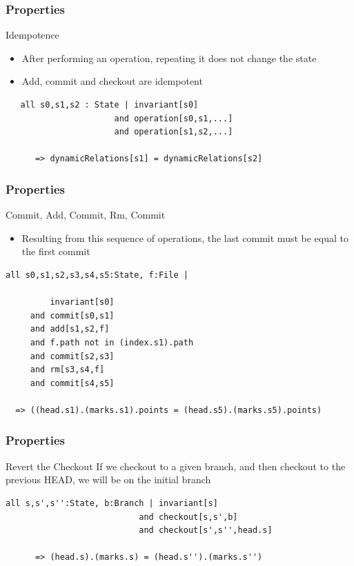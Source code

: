 \documentclass{beamer}
\begin{document}
\begin{frame}[fragile]
   \frametitle{Properties}
   \begin{block}{Idempotence}
      \begin{itemize}
         \item After performing an operation, repeating it does not change the state
         \item Add, commit and checkout are idempotent
      \end{itemize}
   \end{block}
   \scriptsize
   \begin{lstlisting}
   all s0,s1,s2 : State | invariant[s0] 
                      and operation[s0,s1,...] 
                      and operation[s1,s2,...]
      
      => dynamicRelations[s1] = dynamicRelations[s2]
   \end{lstlisting}
\end{frame}

\begin{frame}[fragile]
	\frametitle{Properties}
	\begin{block}{Commit, Add, Commit, Rm, Commit}
	\begin{itemize}
		\item Resulting from this sequence of operations, the last
		commit must be equal to the first commit
	\end{itemize}
	\end{block}
	\scriptsize
	\begin{lstlisting}
all s0,s1,s2,s3,s4,s5:State, f:File | 
      
         invariant[s0] 
     and commit[s0,s1] 
     and add[s1,s2,f] 
     and f.path not in (index.s1).path
     and commit[s2,s3] 
     and rm[s3,s4,f] 
     and commit[s4,s5] 
  
  => ((head.s1).(marks.s1).points = (head.s5).(marks.s5).points)
   \end{lstlisting}
	\normalsize
\end{frame}

\begin{frame}[fragile]
	\frametitle{Properties}
	\begin{block}{Revert the Checkout}
		If we checkout to a given branch, and then checkout to the
      previous HEAD, we will be on the initial branch
	\end{block}
	\scriptsize
	\begin{lstlisting}
all s,s',s'':State, b:Branch | invariant[s] 
                           and checkout[s,s',b] 
                           and checkout[s',s'',head.s] 
      
      => (head.s).(marks.s) = (head.s'').(marks.s'') 
	\end{lstlisting}
	\normalsize
\end{frame}
\end{document}
